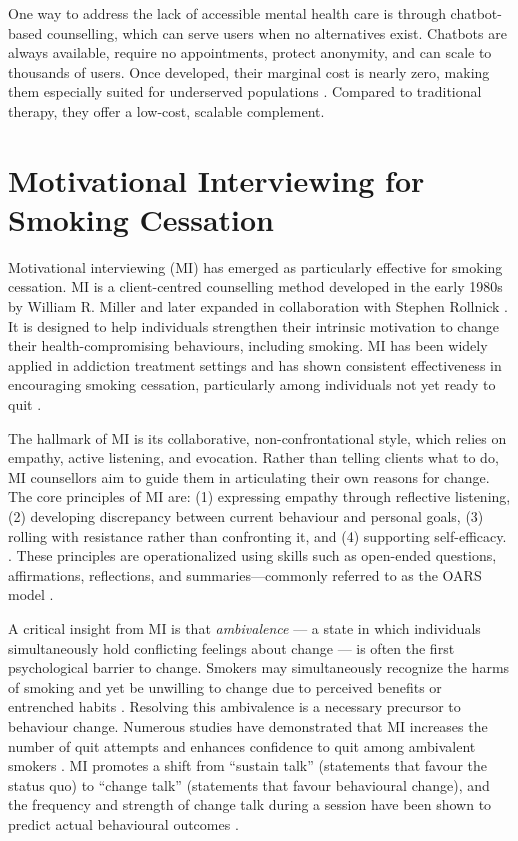 One way to address the lack of accessible mental health care is through chatbot-based counselling, which can serve users when no alternatives exist. Chatbots are always available, require no appointments, protect anonymity, and can scale to thousands of users. Once developed, their marginal cost is nearly zero, making them especially suited for underserved populations \cite{torous2017digital,miner2016smartphone}. Compared to traditional therapy, they offer a low-cost, scalable complement.



\section{Motivational Interviewing for Smoking Cessation}

Motivational interviewing (MI) has emerged as particularly effective for smoking cessation. MI is a client-centred counselling method developed in the early 1980s by William R. Miller and later expanded in collaboration with Stephen Rollnick \cite{miller1991motivational,MillerRollnick2013}. It is designed to help individuals 
strengthen their intrinsic motivation to change their health-compromising behaviours, including smoking. MI has been widely applied in addiction treatment settings and has shown consistent effectiveness in encouraging smoking cessation, particularly among individuals not yet ready to quit \cite{bischof2021evidence,hettema2005meta}.

The hallmark of MI is its collaborative, non-confrontational style, which relies on empathy, active listening, and evocation. Rather than telling clients what to do, MI counsellors aim to guide them in articulating their own reasons for change. The core principles of MI are: (1) expressing empathy through reflective listening, (2) developing discrepancy between current behaviour and personal goals, (3) rolling with resistance rather than confronting it, and (4) supporting self-efficacy. \cite{rollnick2008motivational}. These principles are operationalized using skills such as open-ended questions, affirmations, reflections, and summaries---commonly referred to as the OARS model \cite{Miller_2023}.


A critical insight from MI is that \emph{ambivalence} --- a state in which individuals simultaneously hold conflicting feelings about change --- is often the first psychological barrier to change. Smokers may simultaneously recognize the harms of smoking and yet be unwilling to change due to perceived benefits or entrenched habits \cite{brown2023mi}. Resolving this ambivalence is a necessary precursor to behaviour change. Numerous studies have demonstrated that MI increases the number of quit attempts and enhances confidence to quit among ambivalent smokers \cite{Abar2013, Gwaltney2009-wj}. MI promotes a shift from ``sustain talk'' (statements that favour the status quo) to ``change talk'' (statements that favour behavioural change), and the frequency and strength of change talk during a session have been shown to predict actual behavioural outcomes \cite{apodaca2009mechanisms}.

